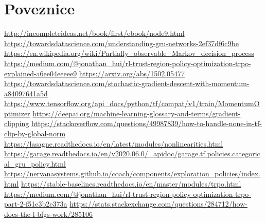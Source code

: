 \section{Poveznice}
\url{http://incompleteideas.net/book/first/ebook/node9.html}\newline
\url{https://towardsdatascience.com/understanding-gru-networks-2ef37df6c9be}\newline
\url{https://en.wikipedia.org/wiki/Partially_observable_Markov_decision_process}\newline
\url{https://medium.com/@jonathan_hui/rl-trust-region-policy-optimization-trpo-explained-a6ee04eeeee9}\newline
\url{https://arxiv.org/abs/1502.05477}\newline
\url{https://towardsdatascience.com/stochastic-gradient-descent-with-momentum-a84097641a5d}\newline
\url{https://www.tensorflow.org/api_docs/python/tf/compat/v1/train/MomentumOptimizer}\newline
\url{https://deepai.org/machine-learning-glossary-and-terms/gradient-clipping}\newline
\url{https://stackoverflow.com/questions/49987839/how-to-handle-none-in-tf-clip-by-global-norm}\newline
\url{https://lasagne.readthedocs.io/en/latest/modules/nonlinearities.html}\newline
\url{https://garage.readthedocs.io/en/v2020.06.0/_apidoc/garage.tf.policies.categorical_gru_policy.html}\newline
\url{https://nervanasystems.github.io/coach/components/exploration_policies/index.html}\newline
\url{https://stable-baselines.readthedocs.io/en/master/modules/trpo.html}\newline
\url{https://medium.com/@jonathan_hui/rl-trust-region-policy-optimization-trpo-part-2-f51e3b2e373a}\newline
\url{https://stats.stackexchange.com/questions/284712/how-does-the-l-bfgs-work/285106}


